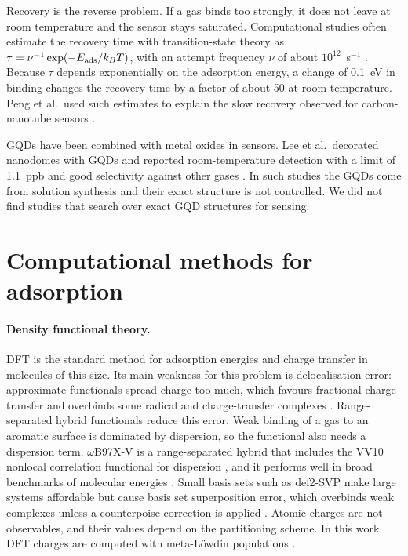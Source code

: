 Recovery is the reverse problem. If a gas binds too strongly, it does not leave at room
temperature and the sensor stays saturated. Computational studies often estimate the recovery time
with transition-state theory as \(\tau = \nu^{-1}\exp(-E_{\mathrm{ads}}/k_BT)\), with an attempt frequency
\(\nu\) of about \(10^{12}\)~s\(^{-1}\) \cite{peng2004cnt}. Because \(\tau\) depends exponentially on
the adsorption energy, a change of 0.1~eV in binding changes the recovery time by a factor of about
50 at room temperature. Peng et al.\ used such estimates to explain the slow recovery observed for
carbon-nanotube  sensors \cite{peng2004cnt}.

GQDs have been combined with metal oxides in  sensors. Lee et al.\ decorated 
nanodomes with GQDs and reported room-temperature detection with a limit of 1.1~ppb and good
selectivity against other gases \cite{lee2023gqdsno2}. In such studies the GQDs come from
solution synthesis and their exact structure is not controlled. We did not find studies that
search over exact GQD structures for  sensing. 

\section{Computational methods for adsorption}
\label{sec:lit-methods}

\paragraph{Density functional theory.}
DFT is the standard method for adsorption energies and charge transfer in molecules of this size.
Its main weakness for this problem is delocalisation error: approximate functionals spread charge
too much, which favours fractional charge transfer and overbinds some radical and charge-transfer
complexes \cite{cohen2008insights}. Range-separated hybrid functionals reduce this error. Weak
binding of a gas to an aromatic surface is dominated by dispersion, so the functional also needs a
dispersion term. \(\omega\)B97X-V is a range-separated hybrid that includes the VV10 nonlocal
correlation functional for dispersion \cite{mardirossian2014wb97xv,vydrov2010vv10}, and it performs
well in broad benchmarks of molecular energies \cite{bursch2022bestpractice}. Small basis sets such
as def2-SVP \cite{weigend2005def2} make large systems affordable but cause basis set superposition
error, which overbinds weak complexes unless a counterpoise correction is applied
\cite{boys1970counterpoise}. Atomic charges are not observables, and their values depend on the
partitioning scheme. In this work DFT charges are computed with meta-L\"owdin populations
\cite{sun2014metalowdin}.

